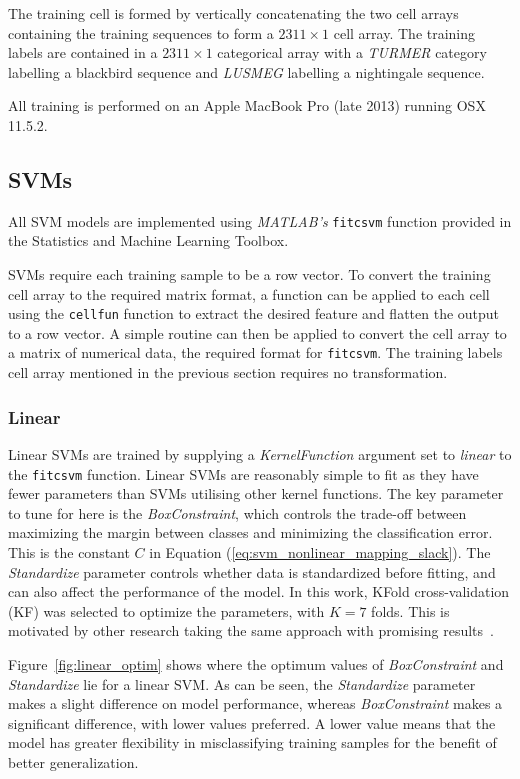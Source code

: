 The training cell is formed by vertically concatenating the two cell arrays
containing the training sequences to form a $2311 \times 1$ cell array. The
training labels are contained in a $2311 \times 1$ categorical array with a
\textit{TURMER} category labelling a blackbird sequence and \textit{LUSMEG}
labelling a nightingale sequence.

All training is performed on an Apple MacBook Pro (late 2013) running OSX
11.5.2.

\subsection{SVMs}

All SVM models are implemented using \textit{MATLAB's} \texttt{fitcsvm}
function provided in the Statistics and Machine Learning Toolbox.

SVMs require each training sample to be a row vector. To convert the training
cell array to the required matrix format, a function can be applied to each cell
using the \texttt{cellfun} function to extract the desired feature and flatten
the output to a row vector. A simple routine can then be applied to convert the
cell array to a matrix of numerical data, the required format for
\texttt{fitcsvm}. The training labels cell array mentioned in the previous
section requires no transformation.

\subsubsection{Linear}

Linear SVMs are trained by supplying a \textit{KernelFunction} argument set to
\textit{linear} to the \texttt{fitcsvm} function. Linear SVMs are reasonably
simple to fit as they have fewer parameters than SVMs utilising other kernel
functions. The key parameter to tune for here is the \textit{BoxConstraint},
which controls the trade-off between maximizing the margin between classes and
minimizing the classification error. This is the constant $C$ in Equation
(\ref{eq:svm_nonlinear_mapping_slack}). The \textit{Standardize} parameter
controls whether data is standardized before fitting, and can also affect the
performance of the model. In this work, KFold cross-validation (KF) was selected
to optimize the parameters, with $K=7$ folds. This is motivated by other
research taking the same approach with promising
results~\cite{ramashini2022robust}.

Figure~\ref{fig:linear_optim} shows where the optimum values of
\textit{BoxConstraint} and \textit{Standardize} lie for a linear SVM\@. As can
be seen, the \textit{Standardize} parameter makes a slight difference on model
performance, whereas \textit{BoxConstraint} makes a significant difference, with
lower values preferred. A lower value means that the model has greater
flexibility in misclassifying training samples for the benefit of better
generalization.

